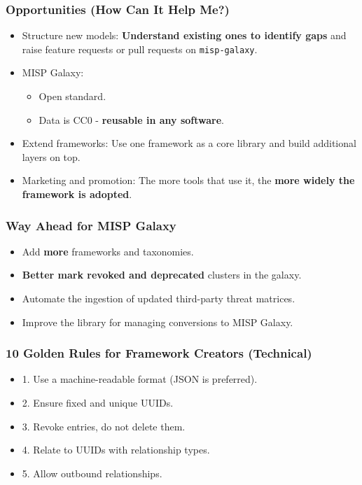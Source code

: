 \begin{frame}
        \frametitle{Opportunities (How Can It Help Me?)}
        \begin{itemize}
		\item Structure new models: {\bf Understand existing ones to identify gaps} and raise feature requests or pull requests on \texttt{misp-galaxy}.
            \item MISP Galaxy:
                \begin{itemize}
                    \item Open standard.
		    \item Data is CC0 - {\bf reusable in any software}.
                \end{itemize}
            \item Extend frameworks: Use one framework as a core library and build additional layers on top.
	    \item Marketing and promotion: The more tools that use it, the {\bf more widely the framework is adopted}.
        \end{itemize}
\end{frame}

\begin{frame}
        \frametitle{Way Ahead for MISP Galaxy}
        \begin{itemize}
            \item Add {\bf more} frameworks and taxonomies.
            \item {\bf Better mark revoked and deprecated} clusters in the galaxy.
            \item Automate the ingestion of updated third-party threat matrices.
            \item Improve the library for managing conversions to MISP Galaxy.
        \end{itemize}
\end{frame}

\begin{frame}
        \frametitle{10 Golden Rules for Framework Creators (Technical)}
        \begin{itemize}
            \item 1. Use a machine-readable format (JSON is preferred).
            \item 2. Ensure fixed and unique UUIDs.
            \item 3. Revoke entries, do not delete them.
            \item 4. Relate to UUIDs with relationship types.
            \item 5. Allow outbound relationships.
        \end{itemize}
\end{frame}

